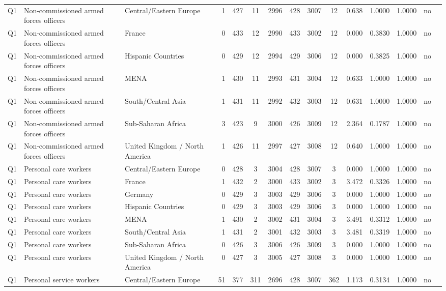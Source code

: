 \begin{longtable}{lllrcccccccccll}
Q1 & Non-commissioned armed forces officers & Central/Eastern Europe & 1 & 427 & 11 & 2996 & 428 & 3007 & 12 & 0.638 & 1.0000 & 1.0000 & no \\
Q1 & Non-commissioned armed forces officers & France & 0 & 433 & 12 & 2990 & 433 & 3002 & 12 & 0.000 & 0.3830 & 1.0000 & no \\
Q1 & Non-commissioned armed forces officers & Hispanic Countries & 0 & 429 & 12 & 2994 & 429 & 3006 & 12 & 0.000 & 0.3825 & 1.0000 & no \\
Q1 & Non-commissioned armed forces officers & MENA & 1 & 430 & 11 & 2993 & 431 & 3004 & 12 & 0.633 & 1.0000 & 1.0000 & no \\
Q1 & Non-commissioned armed forces officers & South/Central Asia & 1 & 431 & 11 & 2992 & 432 & 3003 & 12 & 0.631 & 1.0000 & 1.0000 & no \\
Q1 & Non-commissioned armed forces officers & Sub-Saharan Africa & 3 & 423 & 9 & 3000 & 426 & 3009 & 12 & 2.364 & 0.1787 & 1.0000 & no \\
Q1 & Non-commissioned armed forces officers & United Kingdom / North America & 1 & 426 & 11 & 2997 & 427 & 3008 & 12 & 0.640 & 1.0000 & 1.0000 & no \\
Q1 & Personal care workers & Central/Eastern Europe & 0 & 428 & 3 & 3004 & 428 & 3007 & 3 & 0.000 & 1.0000 & 1.0000 & no \\
Q1 & Personal care workers & France & 1 & 432 & 2 & 3000 & 433 & 3002 & 3 & 3.472 & 0.3326 & 1.0000 & no \\
Q1 & Personal care workers & Germany & 0 & 429 & 3 & 3003 & 429 & 3006 & 3 & 0.000 & 1.0000 & 1.0000 & no \\
Q1 & Personal care workers & Hispanic Countries & 0 & 429 & 3 & 3003 & 429 & 3006 & 3 & 0.000 & 1.0000 & 1.0000 & no \\
Q1 & Personal care workers & MENA & 1 & 430 & 2 & 3002 & 431 & 3004 & 3 & 3.491 & 0.3312 & 1.0000 & no \\
Q1 & Personal care workers & South/Central Asia & 1 & 431 & 2 & 3001 & 432 & 3003 & 3 & 3.481 & 0.3319 & 1.0000 & no \\
Q1 & Personal care workers & Sub-Saharan Africa & 0 & 426 & 3 & 3006 & 426 & 3009 & 3 & 0.000 & 1.0000 & 1.0000 & no \\
Q1 & Personal care workers & United Kingdom / North America & 0 & 427 & 3 & 3005 & 427 & 3008 & 3 & 0.000 & 1.0000 & 1.0000 & no \\
Q1 & Personal service workers & Central/Eastern Europe & 51 & 377 & 311 & 2696 & 428 & 3007 & 362 & 1.173 & 0.3134 & 1.0000 & no \\

\end{longtable}
